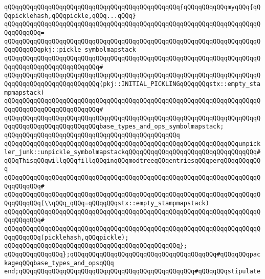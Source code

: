 \verb|qQQqqQQqqQQqqQQqqQQqqQQqqQQqqQQqqQQqqQQqqQQqqQQq{qQQqqQQqqQQqmyqQQq{qQQqpicklehash,qQQqpickle,qQQq...qQQq}|\newline
\verb|qQQqqQQqqQQqqQQqqQQqqQQqqQQqqQQqqQQqqQQqqQQqqQQqqQQqqQQqqQQqqQQqqQQqqQQqqQQqqQQq=|\newline
\verb|qQQqqQQqqQQqqQQqqQQqqQQqqQQqqQQqqQQqqQQqqQQqqQQqqQQqqQQqqQQqqQQqqQQqqQQqqQQqqQQqpkj::pickle_symbolmapstack|\newline
\verb|qQQqqQQqqQQqqQQqqQQqqQQqqQQqqQQqqQQqqQQqqQQqqQQqqQQqqQQqqQQqqQQqqQQqqQQqqQQqqQQqqQQqqQQqqQQqqQQq#|\newline
\verb|qQQqqQQqqQQqqQQqqQQqqQQqqQQqqQQqqQQqqQQqqQQqqQQqqQQqqQQqqQQqqQQqqQQqqQQqqQQqqQQqqQQqqQQqqQQqqQQq(pkj::INITIAL_PICKLINGqQQqqQQqstx::empty_stampmapstack)|\newline
\verb|qQQqqQQqqQQqqQQqqQQqqQQqqQQqqQQqqQQqqQQqqQQqqQQqqQQqqQQqqQQqqQQqqQQqqQQqqQQqqQQqqQQqqQQqqQQqqQQq#|\newline
\verb|qQQqqQQqqQQqqQQqqQQqqQQqqQQqqQQqqQQqqQQqqQQqqQQqqQQqqQQqqQQqqQQqqQQqqQQqqQQqqQQqqQQqqQQqqQQqqQQqbase_types_and_ops_symbolmapstack;|\newline
\verb|qQQqqQQqqQQqqQQqqQQqqQQqqQQqqQQqqQQqqQQqqQQqqQQq|\newline
\verb|qQQqqQQqqQQqqQQqqQQqqQQqqQQqqQQqqQQqqQQqqQQqqQQqqQQqqQQqqQQqqQQqunpickler_junk::unpickle_symbolmapstackqQQqqQQqqQQqqQQqqQQqqQQqqQQqqQQqqQQq#qQQqThisqQQqwillqQQqfillqQQqinqQQqmodtreeqQQqentriesqQQqperqQQqqQQqqQQq|\newline
\verb|qQQqqQQqqQQqqQQqqQQqqQQqqQQqqQQqqQQqqQQqqQQqqQQqqQQqqQQqqQQqqQQqqQQqqQQqqQQqqQQq#|\newline
\verb|qQQqqQQqqQQqqQQqqQQqqQQqqQQqqQQqqQQqqQQqqQQqqQQqqQQqqQQqqQQqqQQqqQQqqQQqqQQqqQQq(\\qQQq_qQQq=qQQqqQQqstx::empty_stampmapstack)|\newline
\verb|qQQqqQQqqQQqqQQqqQQqqQQqqQQqqQQqqQQqqQQqqQQqqQQqqQQqqQQqqQQqqQQqqQQqqQQqqQQqqQQq#|\newline
\verb|qQQqqQQqqQQqqQQqqQQqqQQqqQQqqQQqqQQqqQQqqQQqqQQqqQQqqQQqqQQqqQQqqQQqqQQqqQQqqQQq(picklehash,qQQqpickle);|\newline
\verb|qQQqqQQqqQQqqQQqqQQqqQQqqQQqqQQqqQQqqQQqqQQqqQQq};|\newline
\newline
\verb|qQQqqQQqqQQqqQQq};qQQqqQQqqQQqqQQqqQQqqQQqqQQqqQQqqQQqqQQq#qQQqqQQqpackageqQQqbase_types_and_opsqQQq|\newline
\verb|end;qQQqqQQqqQQqqQQqqQQqqQQqqQQqqQQqqQQqqQQqqQQqqQQq#qQQqqQQqstipulate|\newline
\newline
\newline

